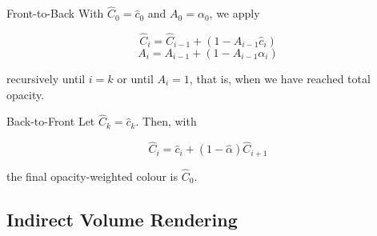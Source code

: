 \documentclass[english]{panikzettel}
\begin{document}
\begin{halfboxl}
\vspace{-\baselineskip}
\begin{defi}{Front-to-Back}
With $\hat C_0 = \hat c_0$ and $A_0 = \alpha_0$, we apply

$$\hat C_i = \hat C_{i-1} + (1 - A_{i-1} \hat c_i)$$
$$A_i = A_{i-1} + (1 - A_{i-1} \alpha_i)$$

recursively until $i = k$ or until $A_i = 1$, that is, when we have reached total opacity.
\end{defi}
\end{halfboxl}%
\begin{halfboxr}
\vspace{-\baselineskip}
\begin{defi}{Back-to-Front}
Let $\hat C_k = \hat c_k$. Then, with

$$\hat C_i = \hat c_i + (1 - \hat \alpha) \hat C_{i+1}$$

the final opacity-weighted colour is $\hat C_0$.
\end{defi}
\end{halfboxr}

\subsection{Indirect Volume Rendering}
\end{document}
